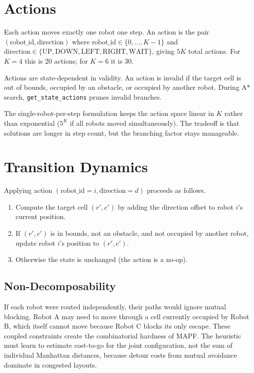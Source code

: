 \documentclass[11pt]{article}
\begin{document}
\section{Actions}

Each action moves exactly one robot one step. An action is the pair $(\text{robot\_id}, \text{direction})$ where $\text{robot\_id} \in \{0, \ldots, K-1\}$ and $\text{direction} \in \{\text{UP}, \text{DOWN}, \text{LEFT}, \text{RIGHT}, \text{WAIT}\}$, giving $5K$ total actions. For $K = 4$ this is 20 actions; for $K = 6$ it is 30.

Actions are state-dependent in validity. An action is invalid if the target cell is out of bounds, occupied by an obstacle, or occupied by another robot. During A* search, \texttt{get\_state\_actions} prunes invalid branches.

The single-robot-per-step formulation keeps the action space linear in $K$ rather than exponential ($5^K$ if all robots moved simultaneously). The tradeoff is that solutions are longer in step count, but the branching factor stays manageable.

\section{Transition Dynamics}

Applying action $(\text{robot\_id} = i, \text{direction} = d)$ proceeds as follows.

\begin{enumerate}[nosep]
    \item Compute the target cell $(r', c')$ by adding the direction offset to robot $i$'s current position.
    \item If $(r', c')$ is in bounds, not an obstacle, and not occupied by another robot, update robot $i$'s position to $(r', c')$.
    \item Otherwise the state is unchanged (the action is a no-op).
\end{enumerate}

\subsection{Non-Decomposability}

If each robot were routed independently, their paths would ignore mutual blocking. Robot A may need to move through a cell currently occupied by Robot B, which itself cannot move because Robot C blocks its only escape. These coupled constraints create the combinatorial hardness of MAPF. The heuristic must learn to estimate cost-to-go for the joint configuration, not the sum of individual Manhattan distances, because detour costs from mutual avoidance dominate in congested layouts.
\end{document}
